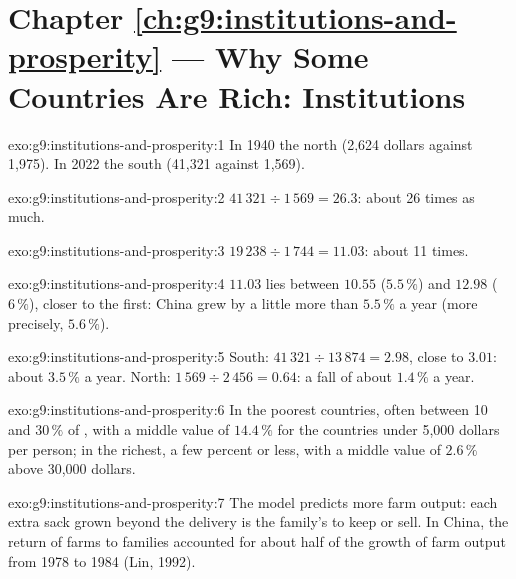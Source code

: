 \section*{Chapter \ref{ch:g9:institutions-and-prosperity} --- Why Some Countries Are Rich: Institutions}

\begin{solution}{exo:g9:institutions-and-prosperity:1}
In 1940 the north (2,624 dollars against 1,975). In 2022 the south (41,321 against 1,569).
\end{solution}

\begin{solution}{exo:g9:institutions-and-prosperity:2}
$41\,321 \div 1\,569 = 26.3$: about 26 times as much.
\end{solution}

\begin{solution}{exo:g9:institutions-and-prosperity:3}
$19\,238 \div 1\,744 = 11.03$: about 11 times.
\end{solution}

\begin{solution}{exo:g9:institutions-and-prosperity:4}
$11.03$ lies between $10.55$ ($5.5\,\%$) and $12.98$ ($6\,\%$), closer to the first: China grew by a little
more than $5.5\,\%$ a year (more precisely, $5.6\,\%$).
\end{solution}

\begin{solution}{exo:g9:institutions-and-prosperity:5}
South: $41\,321 \div 13\,874 = 2.98$, close to $3.01$: about $3.5\,\%$ a year. North: $1\,569 \div 2\,456 =
0.64$: a fall of about $1.4\,\%$ a year.
\end{solution}

\begin{solution}{exo:g9:institutions-and-prosperity:6}
In the poorest countries, often between 10 and $30\,\%$ of , with a middle value of $14.4\,\%$ for the
countries under 5,000 dollars per person; in the richest, a few percent or less, with a middle value of
$2.6\,\%$ above 30,000 dollars.
\end{solution}

\begin{solution}{exo:g9:institutions-and-prosperity:7}
The model predicts more farm output: each extra sack grown beyond the delivery is the family's to keep or
sell. In China, the return of farms to families accounted for about half of the growth of farm output from
1978 to 1984 (Lin, 1992).
\end{solution}

